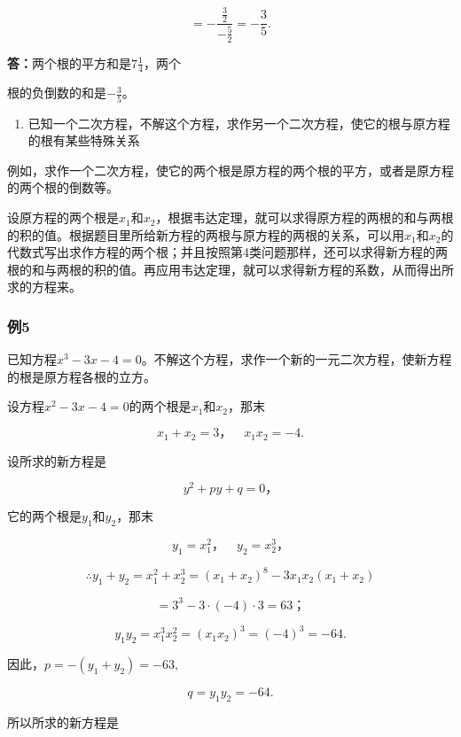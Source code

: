 \[
= - \frac{\frac{3}{2}}{- \frac{5}{2}} = - \frac{3}{5}.
\]

\textbf{答：}两个根的平方和是\(7\frac{1}{4}\)，两个

根的负倒数的和是\(-\frac{3}{5}\)。

\begin{enumerate}[start=5]
\item
  已知一个二次方程，不解这个方程，求作另一个二次方程，使它的根与原方程的根有某些特殊关系
\end{enumerate}

例如，求作一个二次方程，使它的两个根是原方程的两个根的平方，或者是原方程的两个根的倒数等。

设原方程的两个根是\(x_{1}\)和\(x_{2}\)，根据韦达定理，就可以求得原方程的两根的和与两根的积的值。根据题目里所给新方程的两根与原方程的两根的关系，可以用\(x_{1}\)和\(x_{2}\)的代数式写出求作方程的两个根；并且按照第4类问题那样，还可以求得新方程的两根的和与两根的积的值。再应用韦达定理，就可以求得新方程的系数，从而得出所求的方程来。

\subsubsection{例5}

已知方程\(x^{3} - 3x - 4 = 0\)。不解这个方程，求作一个新的一元二次方程，使新方程的根是原方程各根的立方。

设方程\(x^{2} - 3x - 4 = 0\)的两个根是\(x_{1}\)和\(x_{2}\)，那末

\[
x _ {1} + x _ {2} = 3\text{，} \quad x _ {1} x _ {2} = - 4.
\]

设所求的新方程是

\[
y ^ {2} + p y + q = 0\text{，}
\]

它的两个根是\(y_{1}\)和\(y_{2}\)，那末

\[
y _ {1} = x _ {1} ^ {2}\text{，} \quad y _ {2} = x _ {2} ^ {3}\text{，}
\]

\[
\therefore y _ {1} + y _ {2} = x _ {1} ^ {2} + x _ {2} ^ {3} = (x _ {1} + x _ {2}) ^ {8} - 3 x _ {1} x _ {2} (x _ {1} + x _ {2})
\]

\[
= 3 ^ {3} - 3 \cdot (- 4) \cdot 3 = 63\text{；}
\]

\[
y _ {1} y _ {2} = x _ {1} ^ {3} x _ {2} ^ {2} = (x _ {1} x _ {2}) ^ {3} = (- 4) ^ {3} = - 64.
\]

因此，\(p = -(y_{1} + y_{2}) = -63,\)

\[
q = y _ {1} y _ {2} = - 64.
\]

所以所求的新方程是


